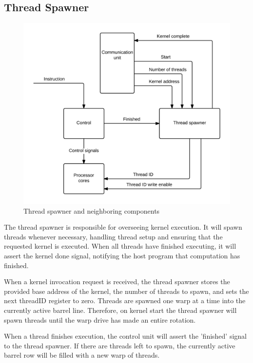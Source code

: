 \subsection{Thread Spawner}

\begin{figure}[H]
	\centering
	\includegraphics[width=\textwidth]{../gpu/diagrams/thread_spawner.png}
	\caption{Thread spawner and neighboring components}
	\label{fig:thread_spawner}
\end{figure}

The thread spawner is responsible for overseeing kernel execution.
It will spawn threads whenever necessary, handling thread setup and ensuring that the requested kernel is executed.
When all threads have finished executing, it will assert the kernel done signal, notifying the host program that computation has finished.

When a kernel invocation request is received, the thread spawner stores the provided base address of the kernel, the number of threads to spawn, and sets the next threadID register to zero.
Threads are spawned one warp at a time into the currently active barrel line.
Therefore, on kernel start the thread spawner will spawn threads until the warp drive has made an entire rotation.

When a thread finishes execution, the control unit will assert the 'finished' signal to the thread spawner.
If there are threads left to spawn, the currently active barrel row will be filled with a new warp of threads.


